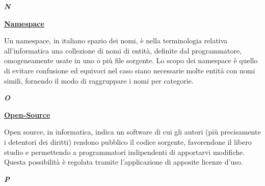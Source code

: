 \newpage

\cleardoublepage
{}
{}
\noindent\hrulefill\hspace{4mm}\textbf{\textsl{\Huge{N}}}\hspace{4mm}\hrulefill

\vspace*{2\bigskipamount}

\begin{addmargin}[0em]{0em}	
	\textbf{\underline{Namespace}} 
\end{addmargin}

\medskip
\begin{addmargin}[5em]{1em}
	Un namespace, in italiano spazio dei nomi, è nella terminologia relativa all'informatica una collezione di nomi di entità, definite dal programmatore, omogeneamente usate in uno o più file sorgente. Lo scopo dei namespace è quello di evitare confusione ed equivoci nel caso siano necessarie molte entità con nomi simili, fornendo il modo di raggruppare i nomi per categorie.
\end{addmargin}	
	
\newpage

\cleardoublepage
{}
{}
\noindent\hrulefill\hspace{4mm}\textbf{\textsl{\Huge{O}}}\hspace{4mm}\hrulefill

\vspace*{2\bigskipamount}

\begin{addmargin}[0em]{0em}	
	\textbf{\underline{Open-Source}} 
\end{addmargin}
	
\medskip
\begin{addmargin}[5em]{1em}	
Open source, in informatica, indica un software di cui gli autori (più precisamente i detentori dei diritti) rendono pubblico il codice sorgente, favorendone il libero studio e permettendo a programmatori indipendenti di apportarvi modifiche. Questa possibilità è regolata tramite l'applicazione di apposite licenze d'uso.	
\end{addmargin}	
	
\newpage

\cleardoublepage
{}
{}
\noindent\hrulefill\hspace{4mm}\textbf{\textsl{\Huge{P}}}\hspace{4mm}\hrulefill

